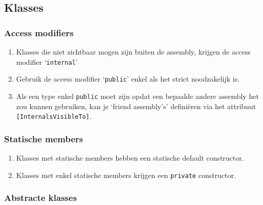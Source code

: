 \documentclass[a4paper,11pt]{article}
\begin{document}
\subsection{Klasses}

\subsubsection{Access modifiers}

\begin{enumerate}[resume]
\item Klasses die niet zichtbaar mogen zijn buiten de assembly, krijgen de 
access modifier `\lstinline !internal!'
\item Gebruik de access modifier `\lstinline !public!' enkel als het strict noodzakelijk is.
\item Als een type enkel \lstinline !public! moet zijn opdat een bepaalde andere assembly
het zou kunnen gebruiken, kan je `friend assembly's' defini\"eren via het
attribuut \lstinline ![InternalsVisibleTo]!.
\end{enumerate}

\subsubsection{Statische members}

\begin{enumerate}[resume]
\item Klasses met statische members hebben een statische default constructor.
\item Klasses met enkel statische members krijgen een \lstinline !private! constructor.
\end{enumerate}

\subsubsection{Abstracte klasses}
\end{document}
